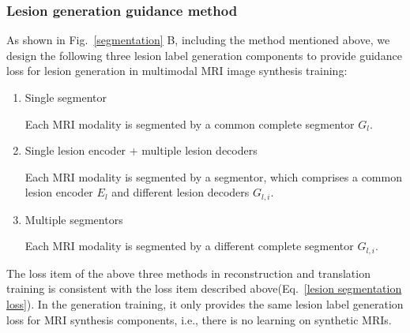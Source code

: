 \documentclass{ecai}
\begin{document}
\subsubsection{Lesion generation guidance method}
\label{label gen methods}
As shown in Fig.~\ref{segmentation} B, including the method mentioned above, we design the following three lesion label generation components to provide guidance loss for lesion generation in multimodal MRI image synthesis training:
\begin{enumerate}
	\item{Single segmentor} 
	
	Each MRI modality  is segmented by a common complete segmentor $G_l$.
	\item{Single lesion encoder + multiple lesion decoders} 
	
	Each MRI modality  is segmented by a segmentor, which comprises a common lesion encoder $E_{l}$ and different lesion decoders $G_{l,i}$. 
	\item{Multiple segmentors} 

	Each MRI modality  is segmented by a different complete segmentor $G_{l,i}$.
\end{enumerate}
The loss item of the above three methods in reconstruction and translation training is consistent with the loss item described above(Eq.~\ref{lesion segmentation loss}). In the generation training, it only provides the same lesion label generation loss for MRI synthesis components, i.e., there is no learning on synthetic MRIs.

\end{document}
